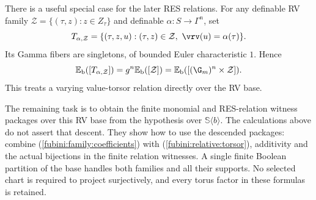 There is a useful special case for the later RES relations.
For any definable RV family
$\mathcal Z=\{(\tau,z):z\in Z_\tau\}$ and definable
$\alpha:S\to\Gamma^n$, set
\[
 T_{\alpha,\mathcal Z}
  =\{(\tau,z,u):(\tau,z)\in\mathcal Z,\
                        \vrv(u)=\alpha(\tau)\}.
\]
Its Gamma fibers are singletons, of bounded Euler
characteristic $1$. Hence
\begin{equation}\label{fubini:relative:torsor}
 \mathbb E_{\mathrm b}([T_{\alpha,\mathcal Z}])
      =g^n\mathbb E_{\mathrm b}([\mathcal Z])
      =\mathbb E_{\mathrm b}([(\G_m)^n\times\mathcal Z]).
\end{equation}
This treats a varying value-torsor relation directly over
the RV base.

The remaining task is to obtain the finite monomial and
RES-relation witness packages over this RV base from the
hypothesis over $\mathbb S\langle b\rangle$.
The calculations above do not assert that descent.
They show how to use the descended packages: combine
(\ref{fubini:family:coefficients}) with
(\ref{fubini:relative:torsor}), additivity and the actual
bijections in the finite relation witnesses.
A single finite Boolean partition of the base handles
both families and all their supports. No selected chart
is required to project surjectively, and every torus
factor in these formulas is retained.
